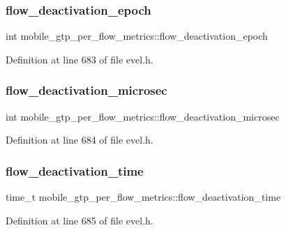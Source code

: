 \subsubsection{\texorpdfstring{flow\+\_\+deactivation\+\_\+epoch}{flow\_deactivation\_epoch}}
{\footnotesize\ttfamily int mobile\+\_\+gtp\+\_\+per\+\_\+flow\+\_\+metrics\+::flow\+\_\+deactivation\+\_\+epoch}



Definition at line 683 of file evel.\+h.

\hypertarget{structmobile__gtp__per__flow__metrics_aa44c196dc2d557e6669f85eedda3f43d}{}\label{structmobile__gtp__per__flow__metrics_aa44c196dc2d557e6669f85eedda3f43d} 
\subsubsection{\texorpdfstring{flow\+\_\+deactivation\+\_\+microsec}{flow\_deactivation\_microsec}}
{\footnotesize\ttfamily int mobile\+\_\+gtp\+\_\+per\+\_\+flow\+\_\+metrics\+::flow\+\_\+deactivation\+\_\+microsec}



Definition at line 684 of file evel.\+h.

\hypertarget{structmobile__gtp__per__flow__metrics_a64780311b54ec5442403f9e0287eb395}{}\label{structmobile__gtp__per__flow__metrics_a64780311b54ec5442403f9e0287eb395} 
\subsubsection{\texorpdfstring{flow\+\_\+deactivation\+\_\+time}{flow\_deactivation\_time}}
{\footnotesize\ttfamily time\+\_\+t mobile\+\_\+gtp\+\_\+per\+\_\+flow\+\_\+metrics\+::flow\+\_\+deactivation\+\_\+time}



Definition at line 685 of file evel.\+h.

